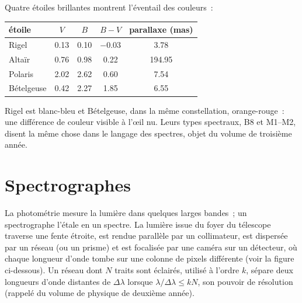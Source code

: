 Quatre étoiles brillantes montrent l'éventail des couleurs~:
\begin{center}
\small
\begin{tabular}{lcccc}
\hline
étoile & $V$ & $B$ & $B - V$ & parallaxe (\unit{mas}) \\
\hline
Rigel & 0.13 & 0.10 & $-0.03$ & 3.78 \\
Altaïr & 0.76 & 0.98 & 0.22 & 194.95 \\
Polaris & 2.02 & 2.62 & 0.60 & 7.54 \\
Bételgeuse & 0.42 & 2.27 & 1.85 & 6.55 \\
\hline
\end{tabular}
\end{center}
Rigel est blanc-bleu et Bételgeuse, dans la même constellation, orange-rouge~:
une différence de couleur visible à l'œil nu. Leurs types spectraux, B8 et
M1--M2, disent la même chose dans le langage des spectres, objet du volume de
troisième année.

\section{Spectrographes}

La photométrie mesure la lumière dans quelques larges bandes~; un spectrographe
l'étale en un spectre. La lumière issue du foyer du télescope traverse une fente
étroite, est rendue parallèle par un collimateur, est dispersée par un réseau
(ou un prisme) et est focalisée par une caméra sur un détecteur, où chaque
longueur d'onde tombe sur une colonne de pixels différente
(voir la figure ci-dessous). Un réseau dont $N$ traits
sont éclairés, utilisé à l'ordre $k$, sépare deux longueurs d'onde distantes de
$\Delta\lambda$ lorsque $\lambda/\Delta\lambda \le kN$, son pouvoir de
résolution (rappelé du volume de physique de deuxième année).

